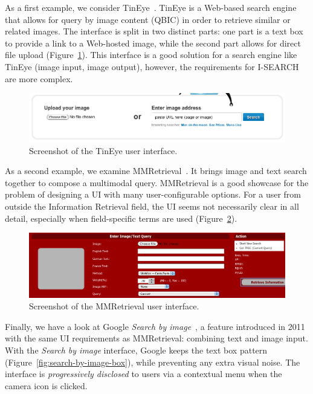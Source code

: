 \documentclass[runningheads,a4paper]{llncs} \usepackage[utf8]{inputenc}
\begin{document}
As a first example, we consider TinEye~\cite{tineye}. TinEye is a Web-based search engine that allows for query by image content (QBIC) in order to retrieve similar or related images. The interface is split in two distinct parts: one part is a text box to provide a link to a Web-hosted image, while the second part allows for direct file upload (Figure~\ref{fig:tineye-ui}). This interface is a good solution for a search engine like TinEye (image input, image output), however, the requirements for \mbox{I-SEARCH} are more complex.

\begin{figure}[h!]
  \centering
    \includegraphics[width=0.7\linewidth]{resources/tineye-UI.png}
  \caption{Screenshot of the TinEye user interface.}
  \label{fig:tineye-ui}
\end{figure}

As a second example, we examine MMRetrieval~\cite{mmretrieval}. It brings image and text search together to compose a multimodal query. MMRetrieval is a good showcase for the problem of designing a UI with many user-configurable options. For a user from outside the Information Retrieval field, the UI seems not necessarily clear in all detail, especially when field-specific terms are used (Figure~\ref{fig:mmretrieval-ui}).

\begin{figure}[h!]
  \centering
    \includegraphics[width=0.7\linewidth]{resources/mmretrieval-UI.png}
  \caption{Screenshot of the MMRetrieval user interface.}
  \label{fig:mmretrieval-ui}
\end{figure}

Finally, we have a look at Google \textit{Search by image}~\cite{searchbyimage}, a feature introduced in 2011 with the same UI requirements as MMRetrieval: combining text and image input. With the \textit{Search by image} interface, Google keeps the text box pattern (Figure~\ref{fig:search-by-image-box}), while preventing any extra visual noise. The interface is \emph{progressively disclosed} to users via a contextual menu when the camera icon is clicked.
\end{document}
